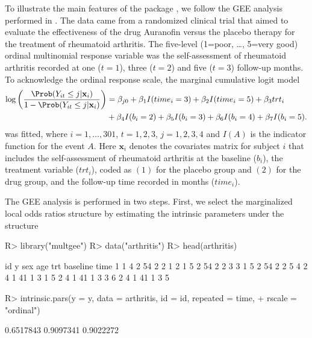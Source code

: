 \documentclass[
]{jss}
\begin{document}
To illustrate the main features of the package , we follow
the GEE analysis performed in \citet{Touloumis2012}. The data came from
a randomized clinical trial \citep{Lipsitz1994} that aimed to evaluate
the effectiveness of the drug Auranofin versus the placebo therapy for
the treatment of rheumatoid arthritis. The five-level (1=poor, \ldots,
5=very good) ordinal multinomial response variable was the
self-assessment of rheumatoid arthritis recorded at one (\(t=1\)), three
(\(t=2\)) and five (\(t=3\)) follow-up months. To acknowledge the
ordinal response scale, the marginal cumulative logit model
\begin{align}
\log \left(\frac{\Prob(Y_{it}\leq j|\mathbf x_i)}{1-\Prob(Y_{it}\leq j|\mathbf x_i)}\right)&=\beta_{j0}+\beta_1 I(time_i=3)+\beta_2 I(time_i=5) +\beta_3 trt_i   \nonumber\\ 
                                                     &+\beta_4 I(b_i=2)+\beta_5 I(b_i=3)+\beta_6 I(b_i=4)+\beta_7 I(b_i=5).
\label{MarginalModelData}
\end{align} was fitted, where \(i=1,\ldots,301\), \(t=1,2,3\),
\(j=1,2,3,4\) and \(I(A)\) is the indicator function for the event
\(A\). Here \(\mathbf x_i\) denotes the covariates matrix for subject
\(i\) that includes the self-assessment of rheumatoid arthritis at the
baseline (\(b_i\)), the treatment variable (\(trt_i\)), coded as \((1)\)
for the placebo group and \((2)\) for the drug group, and the follow-up
time recorded in months (\(time_i\)).

The GEE analysis is performed in two steps. First, we select the
marginalized local odds ratios structure by estimating the intrinsic
parameters under the  structure

\begin{CodeChunk}
\begin{CodeInput}
R> library("multgee")
R> data("arthritis")
R> head(arthritis)
\end{CodeInput}
\begin{CodeOutput}
  id y sex age trt baseline time
1  1 4   2  54   2        2    1
2  1 5   2  54   2        2    3
3  1 5   2  54   2        2    5
4  2 4   1  41   1        3    1
5  2 4   1  41   1        3    3
6  2 4   1  41   1        3    5
\end{CodeOutput}
\begin{CodeInput}
R> intrinsic.pars(y = y, data = arthritis, id = id, repeated = time,
+                   rscale = "ordinal")
\end{CodeInput}
\begin{CodeOutput}
[1] 0.6517843 0.9097341 0.9022272
\end{CodeOutput}
\end{CodeChunk}
\end{document}
